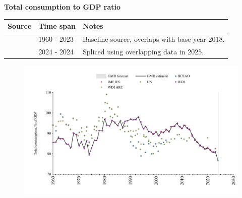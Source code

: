 \documentclass[12pt,a4paper,landscape]{article}
\begin{document}
\begin{adjustbox}{max totalsize={\paperwidth}{\paperheight},center}
\begin{minipage}[t][\textheight][t]{\textwidth}
\vspace*{0.5cm}
{}
\begin{center}
{\Large\bfseries Total consumption to GDP ratio}
\end{center}
\vspace{0.5cm}
\begin{table}[H]
\centering
\small
\begin{tabular}{|l|l|l|}
\hline
\textbf{Source} & \textbf{Time span} & \textbf{Notes} \\
\hline
\rowcolor{white}\cite{WDI}& 1960 - 2023 &Baseline source, overlaps with base year 2018. \\
\rowcolor{lightgray}\cite{BCEAO}& 2024 - 2024 &Spliced using overlapping data in 2025. \\
\hline
\end{tabular}
\end{table}
\begin{figure}[H]
\centering
\includegraphics[width=\textwidth,height=0.6\textheight,keepaspectratio]{graphs/SEN_cons_GDP.pdf}
\end{figure}
\end{minipage}
\end{adjustbox}
\end{document}
